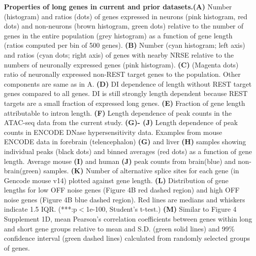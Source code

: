 \textbf{Properties of long genes in current and prior datasets.}\textbf{(A)} Number (histogram) and ratios (dots) of genes expressed in neurons (pink histogram, red dots) and non-neurons (brown histogram, green dots) relative to the number of genes in the entire population (grey histogram) as a function of gene length (ratios computed per bin of 500 genes). 
\textbf{(B)} Number (cyan histogram; left axis) and ratios (cyan dots; right axis) of genes with nearby NRSE relative to the numbers of neuronally expressed genes (pink histogram). 
\textbf{(C)} (Magenta dots) ratio of neuronally expressed non-REST target genes to the population. Other components are same as in A.
\textbf{(D)} DI dependence of length without REST target genes compared to all genes. DI is still strongly length dependent because REST targets are a small fraction of expressed long genes.
\textbf{(E)} Fraction of gene length attributable to intron length.
\textbf{(F)} Length dependence of peak counts in the ATAC-seq data from the current study.
\textbf{(G)- (J)} Length dependence of peak counts in ENCODE DNase hypersensitivity data. Examples from mouse ENCODE data in forebrain (telencephalon) \textbf{(G)} and liver \textbf{(H)} samples showing individual peaks (black dots) and binned averages (red dots) as a function of gene length. Average mouse \textbf{(I)} and human \textbf{(J)} peak counts from brain(blue) and non-brain(green) samples.
\textbf{(K)} Number of alternative splice sites for each gene (in Gencode mouse v14) plotted against gene length.
\textbf{(L)} Distribution of gene lengths for low OFF noise genes (Figure 4B red dashed region) and high OFF noise genes (Figure 4B blue dashed region). Red lines are medians and whiskers indicate 1.5 IQR. (***:p$<$1e-100, Student's t-test.)
\textbf{(M)} Similar to Figure 4 Supplement 1D, mean Pearson's correlation coefficients between genes within long and short gene groups relative to mean and S.D. (green solid lines) and 99\% confidence interval (green dashed lines) calculated from randomly selected groups of genes.




